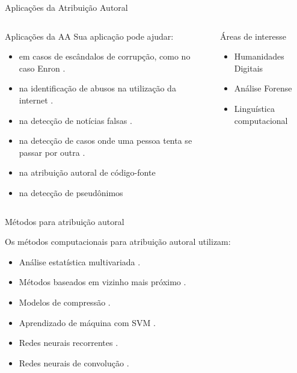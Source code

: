 \begin{frame}{Aplicações da Atribuição Autoral}

\begin{columns}
	\begin{column}{0.65\textwidth}
		\begin{block}{Aplicações da AA}
			Sua aplicação pode ajudar: 
			\begin{itemize}\itemsep9pt
				\item  em casos de escândalos de corrupção, como no caso Enron
				 \cite{corpusEnron,Chen2011}.
				\item na identificação de abusos na utilização da internet \cite{Gillam2012quite}.
				\item na detecção de notícias falsas \cite{Peng2016}.
				\item na detecção de casos onde uma pessoa tenta se passar por outra \cite{Koppel2018_pseud}.
				\item na atribuição autoral de código-fonte \cite{Alsulami2017}
				\item na detecção de pseudônimos \cite{Juola15}
				
			\end{itemize}
		\end{block}
	\end{column}
	\begin{column}{0.3\textwidth}
		\begin{block}{Áreas de interesse}
			\begin{itemize}
				\item Humanidades Digitais
				\item Análise Forense
				\item Linguística computacional
			\end{itemize}
		\end{block}
	\end{column}
\end{columns}
\end{frame}

\begin{frame}{Métodos para atribuição autoral}

Os métodos computacionais para atribuição autoral utilizam: 
\begin{itemize}
	\item Análise estatística multivariada \cite{Savoy2016,AA_delta2017}.
	\item Métodos baseados em vizinho mais próximo \cite{Kocher2017Verificacao,Koppel2018_pseud,Varela2016}.
	\item Modelos de compressão \cite{Halvani2018}.
	\item Aprendizado de máquina com SVM \cite{Schwartz2013,aa-distortion}.
	\item Redes neurais recorrentes \cite{Bagnall2016}.
	\item Redes neurais de convolução \cite{Shrestha2017,Sari2016}.
\end{itemize}

\end{frame}

